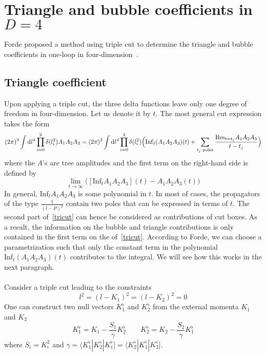 \section{Triangle and bubble coefficients in $D=4$}
Forde proposed a method using triple cut to determine the triangle and bubble coefficients in one-loop in four-dimension~\cite{Forde:2007mi}.
%
\subsection*{Triangle coefficient} 
Upon applying a triple cut, the three delta functions leave only one degree of freedom in four-dimension. 
Let us denote it by $t$.
The most general cut expression takes the form 
\begin{equation}\label{tricut}
(2\pi)^3\int\textrm{d} l^4 \prod_{i=0}^2 \delta(l_i^2) A_1A_2A_3 = 
(2\pi)^3\int\textrm{d} l^4 \prod_{i=0}^2 \delta(l_i^2)\Big(\mathrm{Inf}_t(A_1A_2A_3)(t) + \sum_{\textrm{$t_j$ poles}}\frac{\mathrm{Res}_{t = t_j}A_1 A_2 A_3}{t-t_j}\Big)
\end{equation}
where the $A$'s are tree amplitudes and the first term on the right-hand side is defined by
\begin{equation*}
\lim_{t\rightarrow\infty}\big([\mathrm{Inf}_tA_1A_2A_3](t) - A_1A_2A_3(t)\big)
\end{equation*}
In general, $\mathrm{Inf}_tA_1A_2A_3$ is some polynomial in $t$. 
In most of cases, the propagators of the type $\frac{1}{(l-P)^2}$ contain two poles that can be expressed in terms of $t$. 
The second part of~\cref{tricut} can hence be considered as contributions of cut boxes. 
As a result, the information on the bubble and triangle contributions is only contained in the first term on the \rhs of~\cref{tricut}.
According to Forde, we can choose a parametrization such that only the constant term in the polynomial $\mathrm{Inf}_t(A_1A_2A_3)(t)$ contributes to the integral. 
We will see how this works in the next paragraph.
%
\\\\
Consider a triple cut leading to the constraints
\begin{equation*}
l^2 = (l-K_1)^2 = (l-K_2)^2 = 0
\end{equation*}
One can construct two null vectors $K_1^\flat$ and $K_2^\flat$ from the external momenta $K_1$ and $K_2$ 
\begin{equation*}
K_1^\flat = K_1 - \frac{S_1}{\gamma}K_2^\flat \quad\quad
K_2^\flat = K_2 - \frac{S_2}{\gamma}K_1^\flat
\end{equation*}
%
where $S_i = K_i^2$ and $\gamma = \langle K_1^\flat|K_2^\flat|K_1^\flat] =\langle K_2^\flat|K_1^\flat|K_2^\flat]$.
